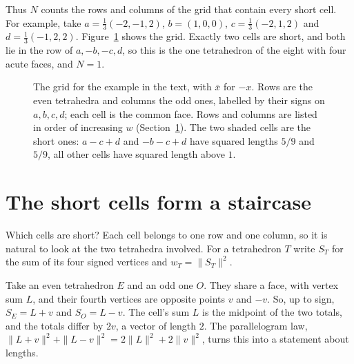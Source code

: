 \documentclass[11pt,a4paper]{article}
\begin{document}
Thus $N$ counts the rows and columns of the grid that contain every short
cell. For example, take
$a=\tfrac13(-2,-1,2)$, $b=(1,0,0)$, $c=\tfrac13(-2,1,2)$ and $d=\tfrac13(-1,2,2)$.
Figure~\ref{fig:grid} shows the grid. Exactly two cells are short, and both lie in the row of
$a,-b,-c,d$, so this is the one tetrahedron of the eight with four acute faces, and $N=1$.

\begin{figure}[ht]
\centering
{}
\caption{The grid for the example in the text, with $\bar x$ for $-x$. Rows are the even
tetrahedra and columns the odd ones, labelled by their signs on $a,b,c,d$; each cell is the
common face. Rows and columns are listed in order of increasing $w$ (Section~\ref{sec:count}).
The two shaded cells are the short ones: $a-c+d$ and $-b-c+d$ have squared lengths $5/9$ and
$5/9$, all other cells have squared length above $1$.}
\label{fig:grid}
\end{figure}

\section{The short cells form a staircase}\label{sec:count}

Which cells are short? Each cell belongs to one row and one column, so it
is natural to look at the two tetrahedra involved. For a tetrahedron $T$
write $S_T$ for the sum of its four signed vertices and $w_T=\|S_T\|^2$.

Take an even tetrahedron $E$ and an odd one $O$. They share a face, with
vertex sum $L$, and their fourth vertices are opposite points $v$ and $-v$.
So, up to sign, $S_E=L+v$ and $S_O=L-v$. The cell's sum $L$ is the midpoint
of the two totals, and the totals differ by $2v$, a vector of length $2$.
The parallelogram law, $\|L+v\|^2+\|L-v\|^2=2\|L\|^2+2\|v\|^2$, turns this
into a statement about lengths.
\end{document}
